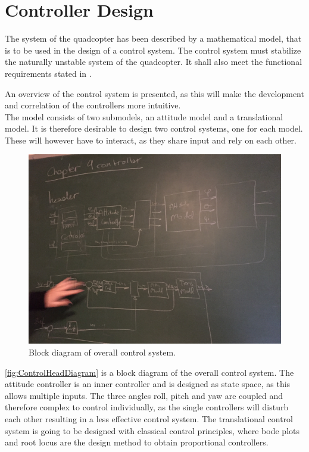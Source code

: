 \chapter{Controller Design}\label{chap:Control}
The system of the quadcopter has been described by a mathematical model, that is to be used in the design of a control system. The control system must stabilize the naturally unstable system of the quadcopter. It shall also meet the functional requirements stated in .

An overview of the control system is presented, as this will make the development and correlation of the controllers more intuitive. \\

The model consists of two submodels, an attitude model and a translational model. It is therefore desirable to design two control systems, one for each model. These will however have to interact, as they share input and rely on each other. 

\begin{figure}[H]
	\centering
	\includegraphics[width=0.7 \textwidth]{figures/ControlHeadDiagram.JPG}
	\caption{Block diagram of overall control system.}
	\label{fig:ControlHeadDiagram}
\end{figure}


\autoref{fig:ControlHeadDiagram} is a block diagram of the overall control system.
The attitude controller is an inner controller and is designed as state space, as this allows multiple inputs. The three angles roll, pitch and yaw are coupled and therefore complex to control individually, as the single controllers will disturb each other resulting in a less effective control system. The translational control system is going to be designed with classical control principles, where bode plots and root locus are the design method to obtain proportional controllers. 

